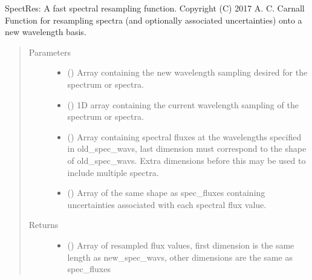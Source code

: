 \documentclass[a4paper,10pt,english]{sphinxmanual}
\begin{document}
\begin{fulllineitems}
\label{\detokenize{cascade.utilities:cascade.utilities.utilities.spectres}}
SpectRes: A fast spectral resampling function.
Copyright (C) 2017  A. C. Carnall
Function for resampling spectra (and optionally associated uncertainties)
onto a new wavelength basis.
\begin{quote}\begin{description}
\item[{Parameters}] \leavevmode\begin{itemize}
\item {} 
 () \textendash{} Array containing the new wavelength sampling desired for the spectrum
or spectra.

\item {} 
 () \textendash{} 1D array containing the current wavelength sampling of the spectrum or
spectra.

\item {} 
 () \textendash{} Array containing spectral fluxes at the wavelengths specified in
old\_spec\_wavs, last dimension must correspond to the shape of
old\_spec\_wavs.
Extra dimensions before this may be used to include multiple spectra.

\item {} 
 (\sphinxstyleliteralemphasis{\sphinxupquote{ (}}\sphinxstyleliteralemphasis{\sphinxupquote{)}}) \textendash{} Array of the same shape as spec\_fluxes containing uncertainties
associated with each spectral flux value.

\end{itemize}

\item[{Returns}] \leavevmode
\begin{itemize}
\item {} 
 () \textendash{} Array of resampled flux values, first dimension is the same length
as new\_spec\_wavs, other dimensions are the same as spec\_fluxes


\end{itemize}
\end{description}
\end{quote}
\end{fulllineitems}
\end{document}
